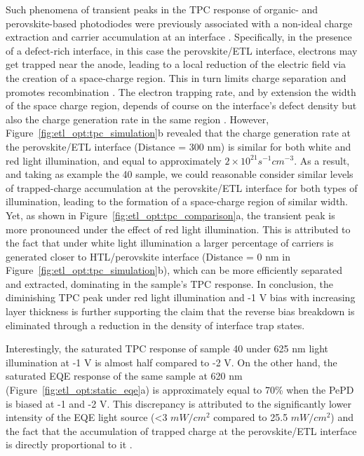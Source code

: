 Such phenomena of transient peaks in the TPC response of organic- and perovskite-based photodiodes were previously associated with a non-ideal charge extraction and carrier accumulation at an interface \cite{Neophytou2019EnhancingLayer, Hwang2009Drift-diffusionCells,Mcneill2009PhotocurrentEffects}. Specifically, in the presence of a defect-rich interface, in this case the perovskite/ETL interface, electrons may get trapped near the anode, leading to a local reduction of the electric field via the creation of a space-charge region. This in turn limits charge separation and promotes recombination \cite{Mcneill2009PhotocurrentEffects}. The electron trapping rate, and by extension the width of the space charge region, depends of course on the interface's defect density but also the charge generation rate in the same region \cite{Hwang2009Drift-diffusionCells}. However, Figure~\ref{fig:etl_opt:tpc_simulation}b revealed that the charge generation rate at the perovskite/ETL interface (Distance = 300 nm) is similar for both white and red light illumination, and equal to approximately $2\times 10^{21}s^{-1}cm^{-3}$. As a result, and taking as example the 40 sample, we could reasonable consider similar levels of trapped-charge accumulation at the perovskite/ETL interface for both types of illumination, leading to the formation of a space-charge region of similar width. Yet, as shown in Figure~\ref{fig:etl_opt:tpc_comparison}a, the transient peak is more pronounced under the effect of red light illumination. This is attributed to the fact that under white light illumination a larger percentage of carriers is generated closer to HTL/perovskite interface (Distance = 0 nm in Figure~\ref{fig:etl_opt:tpc_simulation}b), which can be more efficiently separated and extracted, dominating in the sample's TPC response. In conclusion, the diminishing TPC peak under red light illumination and -1 V bias with increasing  layer thickness is further supporting the claim that the reverse bias breakdown is eliminated through a reduction in the density of interface trap states.

Interestingly, the saturated TPC response of sample 40 under 625 nm light illumination at -1 V is almost half compared to -2 V. On the other hand, the saturated EQE response of the same sample at 620 nm (Figure~\ref{fig:etl_opt:static_eqe}a) is approximately equal to 70\% when the PePD is biased at -1 and -2 V. This discrepancy is attributed to the significantly lower intensity of the EQE light source (<3 $mW/cm^2$ compared to 25.5 $mW/cm^2$) and the fact that the accumulation of trapped charge at the perovskite/ETL interface is directly proportional to it \cite{Hwang2009Drift-diffusionCells,Mcneill2009PhotocurrentEffects}.

